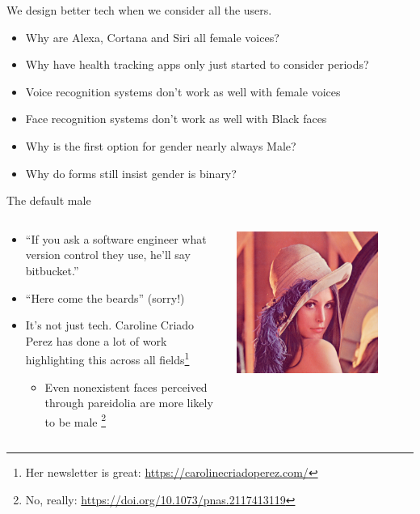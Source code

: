 \documentclass[xcolor=table,aspectratio=169]{beamer}
\begin{document}
\begin{frame}{We design better tech when we consider all the users. }
	\begin{itemize}
		\item Why are Alexa, Cortana and Siri all female voices?
		\item Why have health tracking apps only just started to consider periods?
		\item Voice recognition systems don't work as well with female voices
		\item Face recognition systems don't work as well with Black faces
		\item Why is the first option for gender nearly always Male?
		\item Why do forms still insist gender is binary?
	\end{itemize}
\end{frame}
\begin{frame}{The default male}
	\begin{columns}
		\begin{column}{0.8\textwidth}
	\begin{itemize}
		\item ``If you ask a software engineer what version control they use, he'll say bitbucket.''
		\item ``Here come the beards'' (sorry!)
		\item It's not just tech. Caroline Criado Perez has done a lot of work highlighting this across all fields\footnote{Her newsletter is great: \url{https://carolinecriadoperez.com/}}
			\begin{itemize}
		\item Even nonexistent faces perceived through pareidolia are more likely to be male \footnote{No, really: \url{https://doi.org/10.1073/pnas.2117413119}}
	\end{itemize}
	\end{itemize}
	\end{column}
	\begin{column}{0.2\textwidth}
	\includegraphics[width=0.8\textwidth]{figs/lena.png}
	\end{column}
	\end{columns}
\end{frame}
\end{document}
